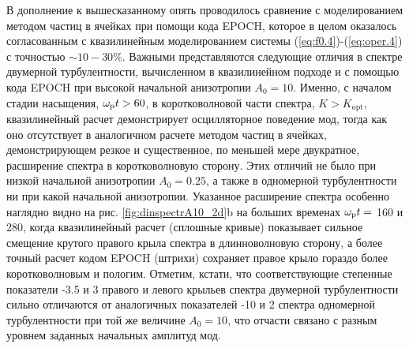 В дополнение к вышесказанному опять проводилось сравнение с моделированием методом частиц в ячейках при помощи кода EPOCH, которое в целом оказалось согласованным с квазилинейным моделированием системы (\ref{eq:f0.4})-(\ref{eq:oper.4}) с точностью $\sim10-30\%$. 
Важными представляются следующие отличия в спектре двумерной турбулентности, вычисленном в квазилинейном подходе и с помощью кода EPOCH при высокой начальной анизотропии $A_0=10$. 
Именно, с началом стадии насыщения, $\omega_\mathrm{p} t > 60$, в коротковолновой части спектра, $K > K_\mathrm{opt}$, квазилинейный расчет демонстрирует осцилляторное поведение мод, тогда как оно отсутствует в аналогичном расчете методом частиц в ячейках, демонстрирующем резкое и существенное, по меньшей мере двукратное, расширение спектра в коротковолновую сторону. 
Этих отличий не было при низкой начальной анизотропии $A_0=0.25$, а также в одномерной турбулентности ни при какой начальной анизотропии. 
Указанное расширение спектра особенно наглядно видно на рис. \ref{fig:dinspectrA10_2d}b на больших временах $\omega_\mathrm{p} t =$ 160 и 280, когда квазилинейный расчет (сплошные кривые) показывает сильное смещение крутого правого крыла спектра в длинноволновую сторону, а более точный расчет кодом EPOCH (штрихи) сохраняет правое крыло гораздо более коротковолновым и пологим. 
Отметим, кстати, что соответствующие степенные показатели -3.5 и 3 правого и левого крыльев спектра двумерной турбулентности сильно отличаются от аналогичных показателей -10 и 2 спектра одномерной турбулентности при той же величине $A_0=10$, что отчасти связано с разным уровнем заданных начальных амплитуд мод. 

